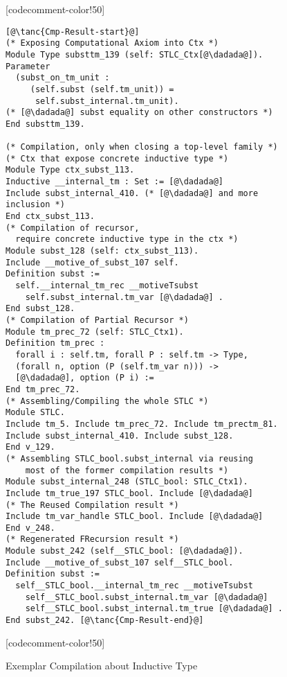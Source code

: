 \begin{figure}
\begin{minipage}{\textwidth}
\begin{multicols}{2}
[codecomment-color!50]


\columnbreak


\begin{lstlisting}
[@\tanc{Cmp-Result-start}@]
(* Exposing Computational Axiom into Ctx *)
Module Type substtm_139 (self: STLC_Ctx[@\dadada@]).
Parameter
  (subst_on_tm_unit :
	 (self.subst (self.tm_unit)) = 
      self.subst_internal.tm_unit).
(* [@\dadada@] subst equality on other constructors *)
End substtm_139. 

(* Compilation, only when closing a top-level family *)
(* Ctx that expose concrete inductive type *)
Module Type ctx_subst_113.
Inductive __internal_tm : Set := [@\dadada@] 
Include subst_internal_410. (* [@\dadada@] and more inclusion *)
End ctx_subst_113.
(* Compilation of recursor, 
  require concrete inductive type in the ctx *)
Module subst_128 (self: ctx_subst_113).
Include __motive_of_subst_107 self.
Definition subst :=
  self.__internal_tm_rec __motiveTsubst
	self.subst_internal.tm_var [@\dadada@] .
End subst_128.
(* Compilation of Partial Recursor *)
Module tm_prec_72 (self: STLC_Ctx1).
Definition tm_prec :
  forall i : self.tm, forall P : self.tm -> Type,
  (forall n, option (P (self.tm_var n))) ->
  [@\dadada@], option (P i) :=
End tm_prec_72. 
(* Assembling/Compiling the whole STLC *)
Module STLC.
Include tm_5. Include tm_prec_72. Include tm_prectm_81.
Include subst_internal_410. Include subst_128.
End v_129.
(* Assembling STLC_bool.subst_internal via reusing 
    most of the former compilation results *)
Module subst_internal_248 (STLC_bool: STLC_Ctx1).
Include tm_true_197 STLC_bool. Include [@\dadada@]
(* The Reused Compilation result *)
Include tm_var_handle STLC_bool. Include [@\dadada@]
End v_248. 
(* Regenerated FRecursion result *)
Module subst_242 (self__STLC_bool: [@\dadada@]).
Include __motive_of_subst_107 self__STLC_bool.
Definition subst :=
  self__STLC_bool.__internal_tm_rec __motiveTsubst
	self__STLC_bool.subst_internal.tm_var [@\dadada@]
    self__STLC_bool.subst_internal.tm_true [@\dadada@] .
End subst_242. [@\tanc{Cmp-Result-end}@]
\end{lstlisting}

[codecomment-color!50]


\end{multicols}
\end{minipage}

\caption{Exemplar Compilation about Inductive Type}\label{fig:plugin-example2}
\end{figure}